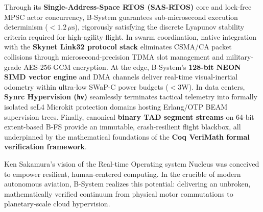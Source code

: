\documentclass[10pt,journal,compsoc,twocolumn]{article}
\begin{document}
Through its \textbf{Single-Address-Space RTOS (SAS-RTOS)} core and lock-free MPSC actor concurrency, B-System guarantees sub-microsecond execution determinism ($<1.2\,\mu\text{s}$), rigorously satisfying the discrete Lyapunov stability criteria required for high-agility flight. In swarm coordination, native integration with the \textbf{Skynet Link32 protocol stack} eliminates CSMA/CA packet collisions through microsecond-precision TDMA slot management and military-grade AES-256-GCM encryption. At the edge, B-System's \textbf{128-bit NEON SIMD vector engine} and DMA channels deliver real-time visual-inertial odometry within ultra-low SWaP-C power budgets ($<3$W). In data centers, \textbf{Synrc Hypervision (\texttt{hv})} seamlessly terminates tactical telemetry into formally isolated seL4 Microkit protection domains hosting Erlang/OTP BEAM supervision trees. Finally, canonical \textbf{binary TAD segment streams} on 64-bit extent-based B-FS provide an immutable, crash-resilient flight blackbox, all underpinned by the mathematical foundations of the \textbf{Coq VeriMath formal verification framework}.

Ken Sakamura's vision of the Real-time Operating system Nucleus was conceived to empower resilient, human-centered computing. In the crucible of modern autonomous aviation, B-System realizes this potential: delivering an unbroken, mathematically verified continuum from physical motor commutations to planetary-scale cloud hypervision.
\end{document}
